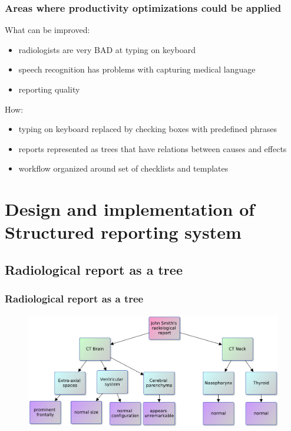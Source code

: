 \documentclass{beamer}
\begin{document}
\begin{frame}
\frametitle{Areas where productivity optimizations could be applied}
What can be improved:
\begin{itemize}
	\item radiologists are \alert{very BAD} at typing on keyboard
	\item speech recognition has problems with capturing medical language
	\item reporting quality  
\end{itemize}

How:
\begin{itemize}
	\item typing on keyboard replaced by checking boxes with predefined phrases
	\item reports represented as trees that have relations between causes and effects
	\item workflow organized around set of checklists and \alert{templates}
\end{itemize}
\end{frame}


\section{Design and implementation of Structured reporting system}
\subsection{Radiological report as a tree}


\begin{frame}
\frametitle{Radiological report as a tree}
\begin{figure}
	\centering
	\includegraphics[width=1\linewidth]{../report-tree}
	\label{fig:report-tree}
\end{figure}
\end{frame}
\end{document}
